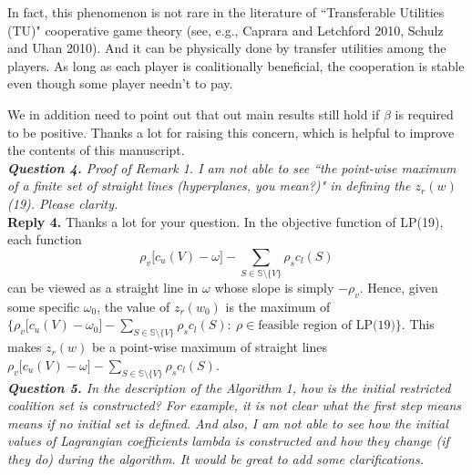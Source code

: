 \documentclass[11pt]{article}
\begin{document}
In fact, this phenomenon is not rare in the literature of ``Transferable Utilities (TU)" cooperative game theory (see, e.g., Caprara and Letchford 2010, Schulz and Uhan 2010).
And it can be physically done by transfer utilities among the players.
As long as each player is coalitionally beneficial, the cooperation is stable even though some player needn't to pay.

We in addition need to point out that out main results still hold if $\beta$ is required to be positive.
Thanks a lot for raising this concern, which is helpful to improve the contents of this manuscript.
\\[4mm]
%
%
\noindent \textit{\textbf{Question 4.}
Proof of Remark 1. I am not able to see ``the point-wise maximum of a finite set of straight lines (hyperplanes, you mean?)" in defining the $z_r(w)$ (19). Please clarity.}
\\[2mm]
\noindent \textbf{Reply 4.}
Thanks a lot for your question. In the objective function of LP(19), each function
$$\rho_v \big[ c_u(V)-\omega \big] - \sum_{S \in \mathbb{S} \setminus \{V\}} \rho_s c_l(S)$$
can be viewed as a straight line in $\omega$ whose slope is simply $-\rho_v$.
Hence, given some specific $\omega_0$, the value of $z_r(w_0)$ is the maximum of $\big\{\rho_v \big[ c_u(V)-\omega_0 \big] - \sum_{S \in \mathbb{S} \setminus \{V\}} \rho_s c_l(S):~\rho \in \text{feasible region of LP(19)} \big\}$.
This makes $z_r(w)$ be a point-wise maximum of straight lines $\rho_v \big[ c_u(V)-\omega \big] - \sum_{S \in \mathbb{S} \setminus \{V\}} \rho_s c_l(S)$.
\\[4mm]
%
%
%
\noindent \textit{\textbf{Question 5.}
In the description of the Algorithm 1, how is the initial restricted coalition set is constructed? For example, it is not clear what the first step means means if no initial set is defined. And also, I am not able to see how the initial values of Lagrangian coefficients lambda is constructed and how they change (if they do) during the algorithm. It would be great to add some clarifications.}
\end{document}
